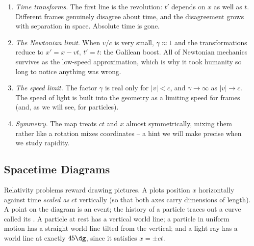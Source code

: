 \documentclass[a4paper]{scrartcl}
\begin{document}
\begin{enumerate}[label=(\roman*)]
	\item \emph{Time transforms.} The first line is the revolution: $t'$ depends on $x$ as well as $t$. Different frames genuinely disagree about time, and the disagreement grows with separation in space. Absolute time is gone.
	\item \emph{The Newtonian limit.} When $v/c$ is very small, $\gamma \approx 1$ and the transformations reduce to $x' = x - vt$, $t' = t$: the Galilean boost. All of Newtonian mechanics survives as the low-speed approximation, which is why it took humanity so long to notice anything was wrong.
	\item \emph{The speed limit.} The factor $\gamma$ is real only for $|v| < c$, and $\gamma \to \infty$ as $|v| \to c$. The speed of light is built into the geometry as a limiting speed for frames (and, as we will see, for particles).
	\item \emph{Symmetry.} The map treats $ct$ and $x$ almost symmetrically, mixing them rather like a rotation mixes coordinates -- a hint we will make precise when we study rapidity.
\end{enumerate}

\subsection{Spacetime Diagrams}

Relativity problems reward drawing pictures. A  plots position $x$ horizontally against time \emph{scaled as} $ct$ vertically (so that both axes carry dimensions of length). A point on the diagram is an event; the history of a particle traces out a curve called its . A particle at rest has a vertical world line; a particle in uniform motion has a straight world line tilted from the vertical; and a light ray has a world line at exactly $45\dg$, since it satisfies $x = \pm ct$.

\begin{center}
\end{center}
\end{document}
